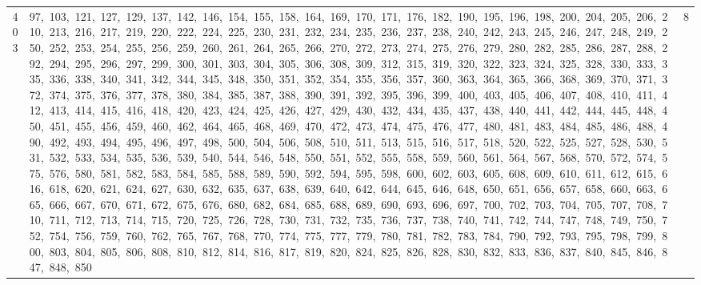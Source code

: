 \begin{longtable}{c|p{}|r}
403 & 97,\ 103,\ 121,\ 127,\ 129,\ 137,\ 142,\ 146,\ 154,\ 155,\ 158,\ 164,\ 169,\ 170,\ 171,\ 176,\ 182,\ 190,\ 195,\ 196,\ 198,\ 200,\ 204,\ 205,\ 206,\ 210,\ 213,\ 216,\ 217,\ 219,\ 220,\ 222,\ 224,\ 225,\ 230,\ 231,\ 232,\ 234,\ 235,\ 236,\ 237,\ 238,\ 240,\ 242,\ 243,\ 245,\ 246,\ 247,\ 248,\ 249,\ 250,\ 252,\ 253,\ 254,\ 255,\ 256,\ 259,\ 260,\ 261,\ 264,\ 265,\ 266,\ 270,\ 272,\ 273,\ 274,\ 275,\ 276,\ 279,\ 280,\ 282,\ 285,\ 286,\ 287,\ 288,\ 292,\ 294,\ 295,\ 296,\ 297,\ 299,\ 300,\ 301,\ 303,\ 304,\ 305,\ 306,\ 308,\ 309,\ 312,\ 315,\ 319,\ 320,\ 322,\ 323,\ 324,\ 325,\ 328,\ 330,\ 333,\ 335,\ 336,\ 338,\ 340,\ 341,\ 342,\ 344,\ 345,\ 348,\ 350,\ 351,\ 352,\ 354,\ 355,\ 356,\ 357,\ 360,\ 363,\ 364,\ 365,\ 366,\ 368,\ 369,\ 370,\ 371,\ 372,\ 374,\ 375,\ 376,\ 377,\ 378,\ 380,\ 384,\ 385,\ 387,\ 388,\ 390,\ 391,\ 392,\ 395,\ 396,\ 399,\ 400,\ 403,\ 405,\ 406,\ 407,\ 408,\ 410,\ 411,\ 412,\ 413,\ 414,\ 415,\ 416,\ 418,\ 420,\ 423,\ 424,\ 425,\ 426,\ 427,\ 429,\ 430,\ 432,\ 434,\ 435,\ 437,\ 438,\ 440,\ 441,\ 442,\ 444,\ 445,\ 448,\ 450,\ 451,\ 455,\ 456,\ 459,\ 460,\ 462,\ 464,\ 465,\ 468,\ 469,\ 470,\ 472,\ 473,\ 474,\ 475,\ 476,\ 477,\ 480,\ 481,\ 483,\ 484,\ 485,\ 486,\ 488,\ 490,\ 492,\ 493,\ 494,\ 495,\ 496,\ 497,\ 498,\ 500,\ 504,\ 506,\ 508,\ 510,\ 511,\ 513,\ 515,\ 516,\ 517,\ 518,\ 520,\ 522,\ 525,\ 527,\ 528,\ 530,\ 531,\ 532,\ 533,\ 534,\ 535,\ 536,\ 539,\ 540,\ 544,\ 546,\ 548,\ 550,\ 551,\ 552,\ 555,\ 558,\ 559,\ 560,\ 561,\ 564,\ 567,\ 568,\ 570,\ 572,\ 574,\ 575,\ 576,\ 580,\ 581,\ 582,\ 583,\ 584,\ 585,\ 588,\ 589,\ 590,\ 592,\ 594,\ 595,\ 598,\ 600,\ 602,\ 603,\ 605,\ 608,\ 609,\ 610,\ 611,\ 612,\ 615,\ 616,\ 618,\ 620,\ 621,\ 624,\ 627,\ 630,\ 632,\ 635,\ 637,\ 638,\ 639,\ 640,\ 642,\ 644,\ 645,\ 646,\ 648,\ 650,\ 651,\ 656,\ 657,\ 658,\ 660,\ 663,\ 665,\ 666,\ 667,\ 670,\ 671,\ 672,\ 675,\ 676,\ 680,\ 682,\ 684,\ 685,\ 688,\ 689,\ 690,\ 693,\ 696,\ 697,\ 700,\ 702,\ 703,\ 704,\ 705,\ 707,\ 708,\ 710,\ 711,\ 712,\ 713,\ 714,\ 715,\ 720,\ 725,\ 726,\ 728,\ 730,\ 731,\ 732,\ 735,\ 736,\ 737,\ 738,\ 740,\ 741,\ 742,\ 744,\ 747,\ 748,\ 749,\ 750,\ 752,\ 754,\ 756,\ 759,\ 760,\ 762,\ 765,\ 767,\ 768,\ 770,\ 774,\ 775,\ 777,\ 779,\ 780,\ 781,\ 782,\ 783,\ 784,\ 790,\ 792,\ 793,\ 795,\ 798,\ 799,\ 800,\ 803,\ 804,\ 805,\ 806,\ 808,\ 810,\ 812,\ 814,\ 816,\ 817,\ 819,\ 820,\ 824,\ 825,\ 826,\ 828,\ 830,\ 832,\ 833,\ 836,\ 837,\ 840,\ 845,\ 846,\ 847,\ 848,\ 850 & 8 \\

\end{longtable}

